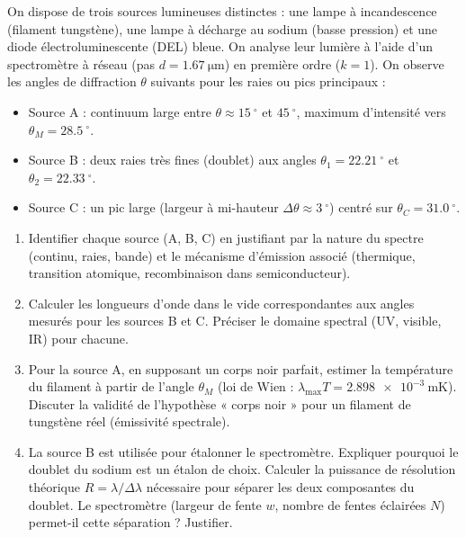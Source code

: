 \documentclass[11pt]{article}
\providecommand{\degree}{^{\circ}}
\begin{document}
\begin{exercice}
On dispose de trois sources lumineuses distinctes : une lampe à incandescence (filament tungstène), une lampe à décharge au sodium (basse pression) et une diode électroluminescente (DEL) bleue. On analyse leur lumière à l'aide d'un spectromètre à réseau (pas $d = \SI{1,67}{\micro\metre}$) en première ordre ($k=1$). On observe les angles de diffraction $\theta$ suivants pour les raies ou pics principaux :
\begin{itemize}
    \item Source A : continuum large entre $\theta \approx \SI{15}{\degree}$ et $\SI{45}{\degree}$, maximum d'intensité vers $\theta_M = \SI{28,5}{\degree}$.
    \item Source B : deux raies très fines (doublet) aux angles $\theta_1 = \SI{22,21}{\degree}$ et $\theta_2 = \SI{22,33}{\degree}$.
    \item Source C : un pic large (largeur à mi-hauteur $\Delta\theta \approx \SI{3}{\degree}$) centré sur $\theta_C = \SI{31,0}{\degree}$.
\end{itemize}
\begin{enumerate}
    \item Identifier chaque source (A, B, C) en justifiant par la nature du spectre (continu, raies, bande) et le mécanisme d'émission associé (thermique, transition atomique, recombinaison dans semiconducteur).
    \item Calculer les longueurs d'onde dans le vide correspondantes aux angles mesurés pour les sources B et C. Préciser le domaine spectral (UV, visible, IR) pour chacune.
    \item Pour la source A, en supposant un corps noir parfait, estimer la température du filament à partir de l'angle $\theta_M$ (loi de Wien : $\lambda_{\max} T = \SI{2,898e-3}{\metre\kelvin}$). Discuter la validité de l'hypothèse « corps noir » pour un filament de tungstène réel (émissivité spectrale).
    \item La source B est utilisée pour étalonner le spectromètre. Expliquer pourquoi le doublet du sodium est un étalon de choix. Calculer la puissance de résolution théorique $R = \lambda/\Delta\lambda$ nécessaire pour séparer les deux composantes du doublet. Le spectromètre (largeur de fente $w$, nombre de fentes éclairées $N$) permet-il cette séparation ? Justifier.
\end{enumerate}
\end{exercice}
\end{document}
